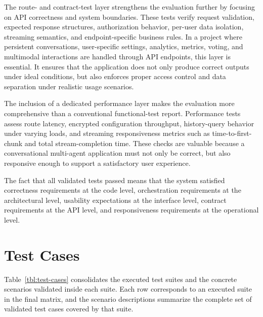 \documentclass[11pt,a4paper]{report}
\begin{document}
The route- and contract-test layer strengthens the evaluation further by
focusing on API correctness and system boundaries. These tests verify
request validation, expected response structures, authorization behavior,
per-user data isolation, streaming semantics, and endpoint-specific business
rules. In a project where persistent conversations, user-specific settings,
analytics, metrics, voting, and multimodal interactions are handled through
API endpoints, this layer is essential. It ensures that the application does
not only produce correct outputs under ideal conditions, but also enforces
proper access control and data separation under realistic usage scenarios.

The inclusion of a dedicated performance layer makes the evaluation more
comprehensive than a conventional functional-test report. Performance tests
assess route latency, encrypted configuration throughput, history-query
behavior under varying loads, and streaming responsiveness metrics such as
time-to-first-chunk and total stream-completion time. These checks are
valuable because a conversational multi-agent application must not only be
correct, but also responsive enough to support a satisfactory user
experience.

The fact that all validated tests passed means that the system satisfied
correctness requirements at the code level, orchestration requirements at
the architectural level, usability expectations at the interface level,
contract requirements at the API level, and responsiveness requirements at
the operational level.

\section{Test Cases}

Table~\ref{tbl:test-cases} consolidates the executed test suites and the
concrete scenarios validated inside each suite. Each row corresponds to an
executed suite in the final matrix, and the scenario descriptions summarize
the complete set of validated test cases covered by that suite.
\end{document}
